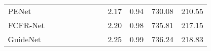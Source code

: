 \documentclass[letterpaper, 10 pt, conference]{ieeeconf}  \usepackage{geometry}
\begin{document}
\begin{table*}[t]
{\begin{tabular}{@{}lccccccccccc@{}}
			\multicolumn{1}{l|}{PENet \cite{PE_Net}}                            & \multicolumn{1}{c|}{\checkmark}                                                        & \multicolumn{1}{c|}{\checkmark}                                                              & \multicolumn{1}{c|}{}                                                            & \multicolumn{1}{c|}{\checkmark}              & \multicolumn{1}{c|}{\checkmark}              & \multicolumn{1}{c|}{}                                                                 & \multicolumn{1}{c|}{}                                                                   & {\color[HTML]{5A554E} 2.17}                                                          & {\color[HTML]{5A554E} 0.94}                                                         & {\color[HTML]{5A554E} 730.08}                                                     & {\color[HTML]{5A554E} 210.55}                               \\
			\multicolumn{1}{l|}{FCFR-Net \cite{FCFR_Net}}                         & \multicolumn{1}{c|}{\checkmark}                                                        & \multicolumn{1}{c|}{\checkmark}                                                              & \multicolumn{1}{c|}{}                                                            & \multicolumn{1}{c|}{}                 & \multicolumn{1}{c|}{\checkmark}              & \multicolumn{1}{c|}{}                                                                 & \multicolumn{1}{c|}{}                                                                   & {\color[HTML]{5A554E} 2.20}                                                          & {\color[HTML]{5A554E} 0.98}                                                         & {\color[HTML]{5A554E} 735.81}                                                     & {\color[HTML]{5A554E} 217.15}                               \\
			\multicolumn{1}{l|}{GuideNet \cite{Guided_Conv}}                         & \multicolumn{1}{c|}{\checkmark}                                                        & \multicolumn{1}{c|}{\checkmark}                                                              & \multicolumn{1}{c|}{}                                                            & \multicolumn{1}{c|}{}                 & \multicolumn{1}{c|}{}                 & \multicolumn{1}{c|}{}                                                                 & \multicolumn{1}{c|}{}                                                                   & 2.25                                                                                 & 0.99                                                                                & 736.24                                                                            & 218.83                                                      \\

\end{tabular}}
\end{table*}
\end{document}
